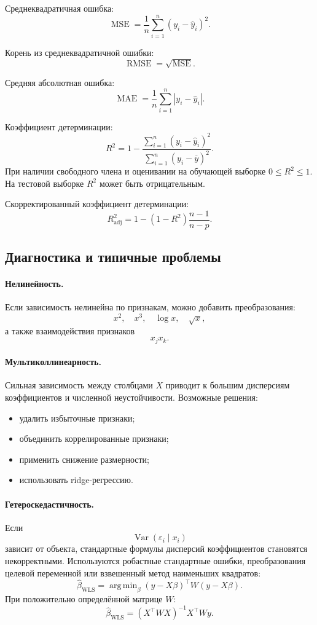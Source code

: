 \documentclass[12pt,a4paper]{article}
\theoremstyle{definition}
\theoremstyle{remark}
\newcommand{\Var}{\operatorname{Var}}
\DeclareMathOperator*{\argmin}{arg\,min}
\begin{document}
Среднеквадратичная ошибка:
\[
    \operatorname{MSE}
    =
    \frac{1}{n}
    \sum_{i=1}^{n}
    (y_i-\widehat y_i)^2.
\]

Корень из среднеквадратичной ошибки:
\[
    \operatorname{RMSE}
    =
    \sqrt{\operatorname{MSE}}.
\]

Средняя абсолютная ошибка:
\[
    \operatorname{MAE}
    =
    \frac{1}{n}
    \sum_{i=1}^{n}
    |y_i-\widehat y_i|.
\]

Коэффициент детерминации:
\[
    R^2
    =
    1-
    \frac{
        \sum_{i=1}^{n}(y_i-\widehat y_i)^2
    }{
        \sum_{i=1}^{n}(y_i-\overline y)^2
    }.
\]
При наличии свободного члена и оценивании на обучающей выборке
$0\leq R^2\leq 1$. На тестовой выборке $R^2$ может быть отрицательным.

Скорректированный коэффициент детерминации:
\[
    R_{\mathrm{adj}}^2
    =
    1-
    (1-R^2)
    \frac{n-1}{n-p}.
\]

\subsection{Диагностика и типичные проблемы}

\paragraph{Нелинейность.}
Если зависимость нелинейна по признакам, можно добавить преобразования:
\[
    x^2,\quad x^3,\quad \log x,\quad \sqrt{x},
\]
а также взаимодействия признаков
\[
    x_jx_k.
\]

\paragraph{Мультиколлинеарность.}
Сильная зависимость между столбцами $X$ приводит к большим дисперсиям
коэффициентов и численной неустойчивости. Возможные решения:

\begin{itemize}
    \item удалить избыточные признаки;
    \item объединить коррелированные признаки;
    \item применить снижение размерности;
    \item использовать ridge-регрессию.
\end{itemize}

\paragraph{Гетероскедастичность.}
Если
\[
    \Var(\varepsilon_i\mid x_i)
\]
зависит от объекта, стандартные формулы дисперсий коэффициентов становятся
некорректными. Используются робастные стандартные ошибки, преобразования
целевой переменной или взвешенный метод наименьших квадратов:
\[
    \widehat\beta_{\mathrm{WLS}}
    =
    \argmin_\beta
    (y-X\beta)^\top W(y-X\beta).
\]
При положительно определённой матрице $W$:
\[
    \widehat\beta_{\mathrm{WLS}}
    =
    (X^\top WX)^{-1}X^\top Wy.
\]
\end{document}
